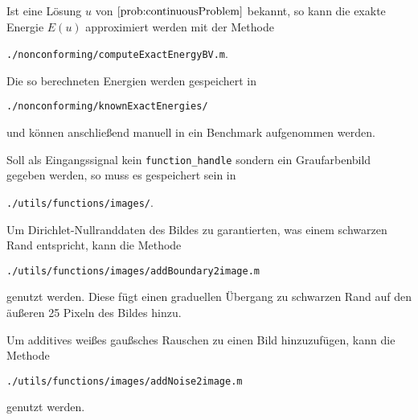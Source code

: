 Ist eine Lösung $u$ von $\Cref{prob:continuousProblem}$ bekannt, so kann die
exakte Energie $E(u)$ approximiert werden mit der Methode
\begin{center}
  \texttt{./nonconforming/computeExactEnergyBV.m}.
\end{center}
Die so berechneten Energien werden gespeichert in 
\begin{center}
  \texttt{./nonconforming/knownExactEnergies/}
\end{center}
und können anschließend manuell in ein Benchmark aufgenommen werden.

Soll als Eingangssignal kein \texttt{function\_handle} sondern ein
Graufarbenbild gegeben werden, so muss es gespeichert sein in 
\begin{center}
  \texttt{./utils/functions/images/}.
\end{center}
Um Dirichlet-Nullranddaten des Bildes zu garantierten, was einem schwarzen Rand
entspricht, kann die Methode 
\begin{center}
  \texttt{./utils/functions/images/addBoundary2image.m}
\end{center}
genutzt werden. Diese fügt einen graduellen Übergang zu schwarzen Rand auf den 
äußeren 25 Pixeln des Bildes hinzu.

Um additives weißes gaußsches Rauschen zu einen Bild hinzuzufügen, kann die
Methode
\begin{center}
  \texttt{./utils/functions/images/addNoise2image.m}
\end{center}
genutzt werden. 

